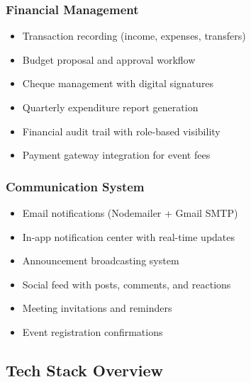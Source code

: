 \documentclass[12pt,a4paper]{article}
\begin{document}
\subsubsection{Financial Management}
\begin{itemize}[noitemsep]
  \item Transaction recording (income, expenses, transfers)
  \item Budget proposal and approval workflow
  \item Cheque management with digital signatures
  \item Quarterly expenditure report generation
  \item Financial audit trail with role-based visibility
  \item Payment gateway integration for event fees
\end{itemize}

\subsubsection{Communication System}
\begin{itemize}[noitemsep]
  \item Email notifications (Nodemailer + Gmail SMTP)
  \item In-app notification center with real-time updates
  \item Announcement broadcasting system
  \item Social feed with posts, comments, and reactions
  \item Meeting invitations and reminders
  \item Event registration confirmations
\end{itemize}

\subsection{Tech Stack Overview}
\end{document}
